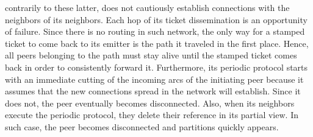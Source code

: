 \begin{asparadesc}
  contrarily to these latter, \SCAMP does not cautiously establish connections
  with the neighbors of its neighbors.  Each hop of its ticket dissemination is
  an opportunity of failure. Since there is no routing in such network, the
  only way for a stamped ticket to come back to its emitter is the path it
  traveled in the first place. Hence, all peers belonging to the path must stay
  alive until the stamped ticket comes back in order to consistently forward
  it.  Furthermore, its periodic protocol starts with an immediate cutting of
  the incoming arcs of the initiating peer because it assumes that the new
  connections spread in the network will establish.  Since it does not, the
  peer eventually becomes disconnected. Also, when its neighbors execute the
  periodic protocol, they delete their reference in its partial view. In such
  case, the peer becomes disconnected and partitions quickly appears.
\end{asparadesc}


